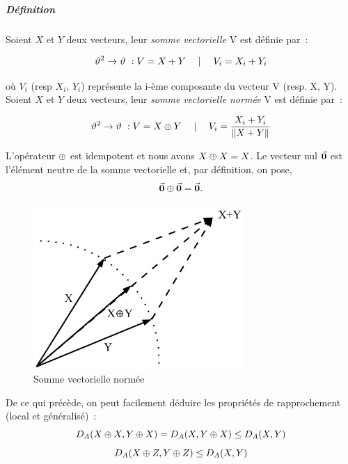 {\subparagraph{Définition}
Soient $X$ et $Y$ deux vecteurs, leur \emph{somme vectorielle} V est
définie par~:

\begin{equation}
\vartheta^{2} \rightarrow \vartheta~: V = X + Y \quad \mid \quad V_{i} = X_{i} + Y_{i}
\end{equation}

où $V_i$ (resp $X_i$, $Y_i$) représente la i-ème composante du
vecteur V (resp. X, Y).
\\

Soient $X$ et $Y$ deux vecteurs, leur \emph{somme vectorielle normée}
V est définie par~:

\begin{equation}
\vartheta^{2} \rightarrow \vartheta~: V = X \oplus Y \quad \mid \quad V_{i} = \frac{X_{i} + Y_{i}}{\|X+Y\|}
\end{equation}

L'opérateur $\oplus$ est idempotent et nous avons $X\oplus X = X$.
Le vecteur nul $\vec{\mathbf{0}}$ est l'élément neutre de la somme vectorielle
et, par définition, on pose,
\begin{equation}
\vec{\mathbf{0}} \oplus \vec{\mathbf{0}} = \vec{\mathbf{0}}.
\end{equation}

\begin{figure}[h]
  \centering\includegraphics[width=8cm]{2_Etat-art/img/exempleSommeNormee}
\caption{Somme vectorielle normée} 

\label{schema_general}
\end{figure}

De ce qui précède, on peut facilement déduire les propriétés de
rapprochement (local et généralisé)~:
\begin{equation}
D_{A}(X\oplus X,Y\oplus X) = D_{A}(X,Y \oplus X) \leq D_{A}(X,Y)
\end{equation}
\begin{equation}
D_{A}(X\oplus Z,Y\oplus Z) \leq D_{A}(X,Y)
\end{equation}

}
